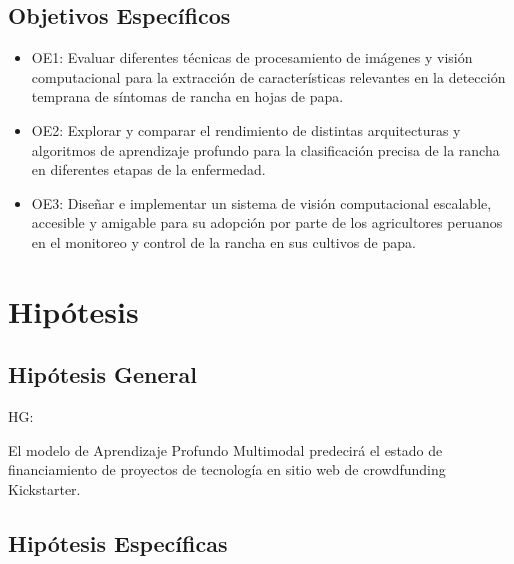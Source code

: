 \subsection{Objetivos Específicos}
\newcommand{\Objone}{
	Evaluar diferentes técnicas de procesamiento de imágenes y visión computacional para la extracción de características relevantes en la detección temprana de síntomas de rancha en hojas de papa.
}

\newcommand{\Objtwo}{
	Explorar y comparar el rendimiento de distintas arquitecturas y algoritmos de aprendizaje profundo para la clasificación precisa de la rancha en diferentes etapas de la enfermedad.
}

\newcommand{\Objthree}{
	Diseñar e implementar un sistema de visión computacional escalable, accesible y amigable para su adopción por parte de los agricultores peruanos en el monitoreo y control de la rancha en sus cultivos de papa.
}

\begin{itemize}
	\item OE1: {\Objone}
	\item OE2: {\Objtwo}
	\item OE3: {\Objthree}
\end{itemize}

\section{Hipótesis}

\subsection{Hipótesis General}
HG: \newcommand{\HipotesisGeneral}{
	El modelo de Aprendizaje Profundo Multimodal predecirá el estado de financiamiento de proyectos de tecnología en sitio web de crowdfunding Kickstarter.
}
\HipotesisGeneral
\subsection{Hipótesis Específicas}
\newcommand{\Hone}{
El análisis de las alternativas propuestas en los trabajos previos influirá en la selección de características y desarrollo del marco de trabajo de la investigación.
}
\newcommand{\Htwo}{
La factibilidad técnica del ambiente de desarrollo para las características del modelo de Aprendizaje Profundo Multimodal determinará la aplicabilidad de las condiciones de las propuestas de la literatura.
}
\newcommand{\Hthree}{
El modelo de Aprendizaje Profundo Multimodal se verá afectado por las características consideradas en su desarrollo.
}
\newcommand{\Hfour}{
La herramienta analítica implementada ayudará en tiempo real a los emprendedores y creadores de proyectos de tecnología en la toma de decisiones y estrategias de sus campañas.
}

